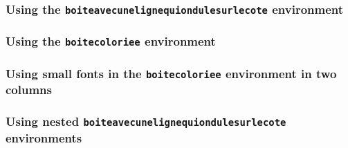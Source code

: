 \documentclass[a4paper,10pt]{article}
\begin{document}
\subsubsection*{Using the \texttt{boiteavecunelignequiondulesurlecote} environment}

\begin{Example}
  \begin{boiteavecunelignequiondulesurlecote}
    \lipsum[1-3]
  \end{boiteavecunelignequiondulesurlecote}
\end{Example}

\subsubsection*{Using the \texttt{boitecoloriee} environment}

\begin{Example}
  \bkcounttrue
  \begin{boitecoloriee}
    \lipsum[1-2]
  \end{boitecoloriee}
\end{Example}

\subsubsection*{Using small fonts in the \texttt{boitecoloriee} environment in two columns}

\begin{Example}
  \begin{multicols}{2}
    \begin{boitecoloriee}
      \small \lipsum[1-2]
    \end{boitecoloriee}
  \end{multicols}
\end{Example}

\subsubsection*{Using nested \texttt{boiteavecunelignequiondulesurlecote} environments}

\begin{Example}
  \bkcountfalse
  \begin{boiteavecunelignequiondulesurlecote}
    \lipsum[1]\bigskip
    \begin{boiteavecunelignequiondulesurlecote}
      \lipsum[2]\bigskip
      \begin{boiteavecunelignequiondulesurlecote}
        \lipsum[3]\bigskip
      \end{boiteavecunelignequiondulesurlecote}
      \lipsum[4]
    \end{boiteavecunelignequiondulesurlecote}
    \lipsum[5]
  \end{boiteavecunelignequiondulesurlecote}
\end{Example}
\end{document}
